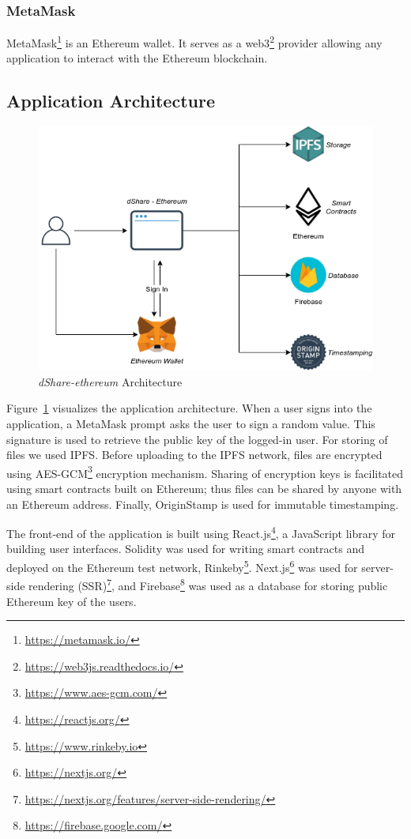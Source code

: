 			\subsubsection{MetaMask}
			MetaMask\footnote{\url{https://metamask.io/}} is an Ethereum wallet. It serves as a web3\footnote{\url{https://web3js.readthedocs.io/}} provider allowing any application to interact with the Ethereum blockchain.
			
		\subsection{Application Architecture}
		
			\begin{figure}[h]
				\includegraphics[width=\linewidth]{figures/dshare-ethereum}
				\caption{\label{fig:dshare-ethereum} \textit{dShare-ethereum} Architecture}
			\end{figure}
			
			Figure~\ref{fig:dshare-ethereum} visualizes the application architecture. When a user signs into the application, a MetaMask prompt asks the user to sign a random value. This signature is used to retrieve the public key of the logged-in user. For storing of files we used IPFS. Before uploading to the IPFS network, files are encrypted using AES-GCM\footnote{\url{https://www.aes-gcm.com/}} encryption mechanism. Sharing of encryption keys is facilitated using smart contracts built on Ethereum; thus files can be shared by anyone with an Ethereum address. Finally, OriginStamp is used for immutable timestamping.
			
			The front-end of the application is built using React.js\footnote{\url{https://reactjs.org/}}, a JavaScript library for building user interfaces. Solidity was used for writing smart contracts and deployed on the Ethereum test network, Rinkeby\footnote{\url{https://www.rinkeby.io}}. Next.js\footnote{\url{https://nextjs.org/}} was used for server-side rendering (SSR)\footnote{\url{https://nextjs.org/features/server-side-rendering/}}, and Firebase\footnote{\url{https://firebase.google.com/}} was used as a database for storing public Ethereum key of the users.
			
